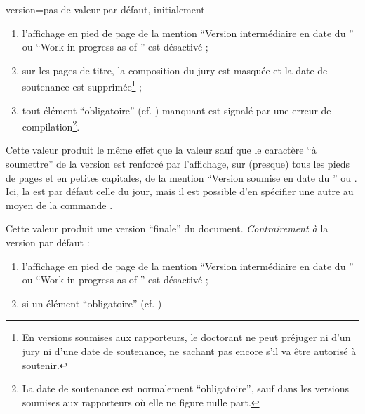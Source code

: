 {\begin{docKey}{version}{=\textbar{}\textbar{}\textbar{}\textbar{}\textbar{}}{pas
      de valeur par défaut, initialement }
\begin{description}
\begin{enumerate}
      \item l'affichage en pied de page de la mention
        \enquote{Version intermédiaire en date du } ou
        \foreignquote{english}{Work in progress as of } est
        désactivé ;
      \item {}%
        sur les pages de titre, la composition du jury est masquée et la date de
        soutenance est supprimée\footnote{En versions soumises aux rapporteurs,
          le doctorant ne peut préjuger ni d'un jury ni d'une date de
          soutenance, ne sachant pas encore s'il va être autorisé à soutenir.} ;
      \item tout élément \enquote{obligatoire} (cf. )
        manquant est signalé par une erreur de compilation\footnote{La date de
          soutenance est normalement \enquote{obligatoire}, sauf dans les
          versions soumises aux rapporteurs où elle ne figure nulle part.}.
      \end{enumerate}
    \item[\docValue{submitted*}.] %
      Cette valeur produit le même effet que la valeur  sauf
      que le caractère \enquote{à soumettre} de la version est renforcé par
      l'affichage, sur (presque) tous les pieds de pages et
      en petites capitales, de la mention \enquote{Version soumise en date du
        } ou . Ici, la
       est par défaut celle du jour, mais il est possible d'en
      spécifier une autre au moyen de la commande .
    \item[\docValue{final}.]
      Cette valeur produit une version \enquote{finale}
      du document. \emph{Contrairement à} la version par défaut :
      \begin{enumerate}
      \item l'affichage en pied de page de la mention
        \enquote{Version intermédiaire en date du } ou
        \foreignquote{english}{Work in progress as of } est
        désactivé ;
      \item si un élément \enquote{obligatoire} (cf. )

\end{enumerate}
\end{description}
\end{docKey}}
